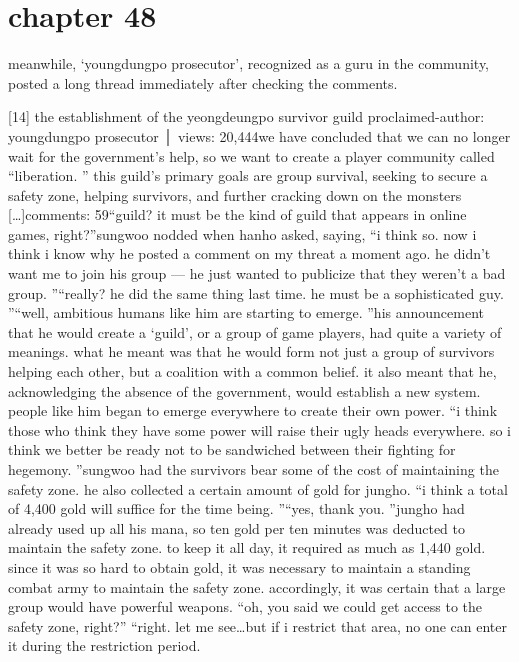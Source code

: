\section{chapter 48}

                            meanwhile, ‘youngdungpo prosecutor’, recognized as a guru in the community, posted a long thread immediately after checking the comments.





[14] the establishment of the yeongdeungpo survivor guild proclaimed-author: youngdungpo prosecutor │ views: 20,444we have concluded that we can no longer wait for the government’s help, so we want to create a player community called “liberation.
” this guild’s primary goals are group survival, seeking to secure a safety zone, helping survivors, and further cracking down on the monsters […]comments: 59“guild? it must be the kind of guild that appears in online games, right?”sungwoo nodded when hanho asked, saying, “i think so.
 now i think i know why he posted a comment on my threat a moment ago.
 he didn’t want me to join his group — he just wanted to publicize that they weren’t a bad group.
”“really? he did the same thing last time.
 he must be a sophisticated guy.
”“well, ambitious humans like him are starting to emerge.
”his announcement that he would create a ‘guild’, or a group of game players, had quite a variety of meanings.
 what he meant was that he would form not just a group of survivors helping each other, but a coalition with a common belief.
 it also meant that he, acknowledging the absence of the government, would establish a new system.
 people like him began to emerge everywhere to create their own power.
“i think those who think they have some power will raise their ugly heads everywhere.
 so i think we better be ready not to be sandwiched between their fighting for hegemony.
”sungwoo had the survivors bear some of the cost of maintaining the safety zone.
 he also collected a certain amount of gold for jungho.
“i think a total of 4,400 gold will suffice for the time being.
”“yes, thank you.
”jungho had already used up all his mana, so ten gold per ten minutes was deducted to maintain the safety zone.
 to keep it all day, it required as much as 1,440 gold.
 since it was so hard to obtain gold, it was necessary to maintain a standing combat army to maintain the safety zone.
 accordingly, it was certain that a large group would have powerful weapons.
“oh, you said we could get access to the safety zone, right?”
“right.
 let me see…but if i restrict that area, no one can enter it during the restriction period.
